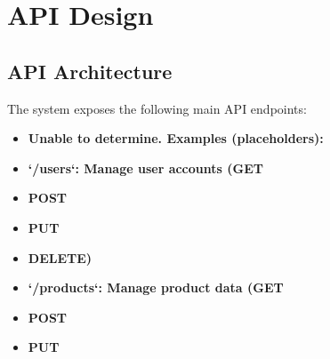 \documentclass[11pt,a4paper,oneside]{article}
\begin{document}
\section{API Design}

\subsection{API Architecture}

The system exposes the following main API endpoints:
\begin{itemize}
\item \textbf{Unable to determine. Examples (placeholders):}
\item \textbf{`/users`: Manage user accounts (GET}
\item \textbf{POST}
\item \textbf{PUT}
\item \textbf{DELETE)}
\item \textbf{`/products`: Manage product data (GET}
\item \textbf{POST}
\item \textbf{PUT}
\end{itemize}
\end{document}

